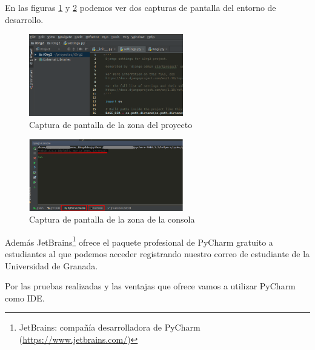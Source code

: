 \bigskip
En las figuras \ref{fig:pycharm1} y \ref{fig:pycharm2} podemos ver dos capturas de pantalla del entorno de desarrollo.

\begin{figure}[!h]
  \begin{center}
  \includegraphics[width=0.6\textwidth]{../images/pycharm1.png}
  \caption[Pycharm 1/2]{ Captura de pantalla de la zona del proyecto }
  \label{fig:pycharm1}
  \end{center}
\end{figure}

\begin{figure}[!h]
  \begin{center}
  \includegraphics[width=0.6\textwidth]{../images/pycharm2.png}
  \caption[Pycharm 2/2]{ Captura de pantalla de la zona de la consola }
  \label{fig:pycharm2}
  \end{center}
\end{figure}

\bigskip
Además JetBrains\footnote{JetBrains: compañía desarrolladora de PyCharm (\href{https://www.jetbrains.com/}{https://www.jetbrains.com/})} ofrece el paquete profesional de PyCharm gratuito a estudiantes al que podemos acceder registrando nuestro correo de estudiante de la Universidad de Granada.

\bigskip 
Por las pruebas realizadas y las ventajas que ofrece vamos a utilizar PyCharm como IDE.



